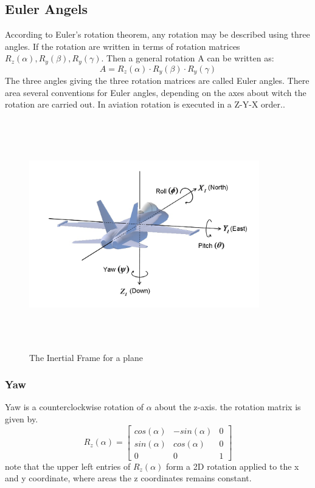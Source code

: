 \subsection{Euler Angels}
According to Euler's rotation theorem, any rotation may be described using three angles. If  the rotation are written in terms of rotation matrices $R_{z}(\alpha),R_{y}(\beta),R_{y}(\gamma)$. Then a general rotation A can be written as:
\begin{equation}
A = R_{z}(\alpha)\cdot R_{y}(\beta)\cdot R_{y}(\gamma)
\end{equation}
The three angles giving the three rotation matrices are called Euler angles. There area several conventions for Euler angles, depending on the axes about witch the rotation are carried out. In aviation rotation is executed in a Z-Y-X order.\cite{Euler}.
\begin{figure}[H]
\centering
\includegraphics[width=10cm,height=10cm,keepaspectratio]{imagenes/Euler_Angles.png}
\caption{The Inertial Frame for a plane}
\label{fig:fixed-wing_UAS}
\end{figure}
\subsubsection{Yaw}
Yaw is a counterclockwise rotation of $\alpha$ about the z-axis. the rotation matrix is given by.
\begin{equation}R_{z}(\alpha) =
\begin{bmatrix}cos(\alpha) & -sin(\alpha) & 0 \\sin(\alpha) & cos(\alpha)& 0\\0 &0&1 \end{bmatrix}
\end{equation}
note that the upper left entries of $R_{z}(\alpha)$ form a 2D rotation applied to the x and y coordinate, where areas the z coordinates remains constant.\cite{Euler_angles}
